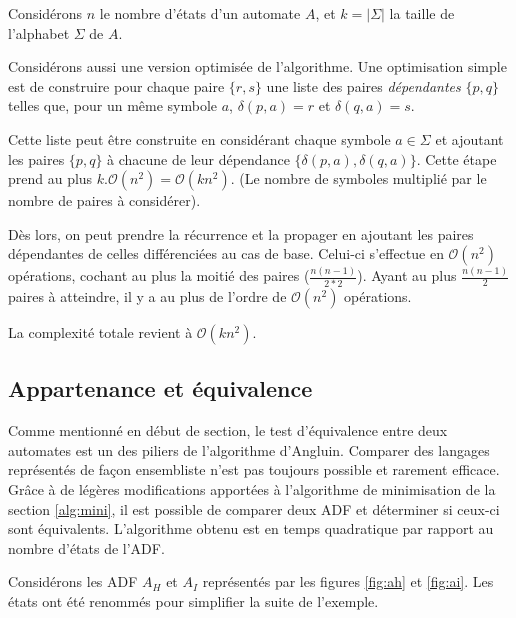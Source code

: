 \begin{complexity}

Considérons $n$ le nombre d'états d'un automate $A$, et $k=|\Sigma |$ la taille de l'alphabet $\Sigma$ de $A$.

Considérons aussi une version optimisée de l'algorithme. Une optimisation simple est de construire pour chaque paire $\{r,s\}$ une liste des paires \emph{dépendantes} $\{p,q\}$ telles que, pour un même symbole $a$, $\delta(p,a)=r$ et $\delta(q,a)=s$.

Cette liste peut être construite en considérant chaque symbole $a \in \Sigma$ et ajoutant les paires $\{p,q\}$ à chacune de leur dépendance $\{\delta(p,a),\delta(q,a)\}$. Cette étape prend au plus $k.\mathcal{O}(n^2)=\mathcal{O}(kn^2)$. (Le nombre de symboles multiplié par le nombre de paires à considérer).

Dès lors, on peut prendre la récurrence et la propager en ajoutant les paires dépendantes de celles différenciées au cas de base. Celui-ci s'effectue en $\mathcal{O}(n^2)$ opérations, cochant au plus la moitié des paires ($\frac{n(n-1)}{2*2}$). Ayant au plus $\frac{n(n-1)}{2}$ paires à atteindre, il y a au plus de l'ordre de $\mathcal{O}(n^2)$ opérations.

La complexité totale revient à $\mathcal{O}(kn^2)$.
\end{complexity}




\subsection{Appartenance et équivalence}\label{tfa:eqauto}
Comme mentionné en début de section, le test d'équivalence entre deux automates est un des piliers de l'algorithme d'Angluin. Comparer des langages représentés de façon ensembliste n'est pas toujours possible et rarement efficace. Grâce à de légères modifications apportées à l'algorithme de minimisation de la section \ref{alg:mini}, il est possible de comparer deux ADF et déterminer si ceux-ci sont équivalents. L'algorithme obtenu est en temps quadratique par rapport au nombre d'états de l'ADF.


Considérons les ADF $A_H$ et $A_I$ représentés par les figures \ref{fig:ah} et \ref{fig:ai}. Les états ont été renommés pour simplifier la suite de l'exemple.

